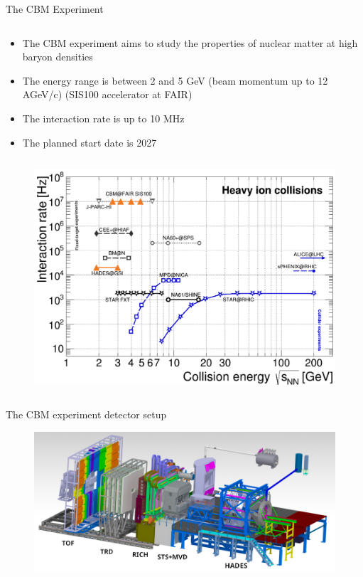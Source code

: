 \begin{columnframe}{The CBM Experiment}
    \begin{column}{0.5\textwidth}
        \begin{itemize}
            \item The CBM experiment aims to study the properties of nuclear matter at high baryon densities
            \item The energy range is between 2 and 5 GeV (beam momentum up to 12 AGeV/c)
                  (SIS100 accelerator at FAIR)
            \item The interaction rate is up to 10 MHz
            \item The planned start date is 2027
        \end{itemize}
    \end{column}
    \begin{column}{0.5\textwidth}
        \begin{figure}
            \centering
            \includegraphics[width=\textwidth, frame]{images/galatyuk_map_of_experiments.png}
        \end{figure}
    \end{column}
\end{columnframe}

\begin{frame}{The CBM experiment detector setup}
    \begin{figure}
        \centering
        \includegraphics[width=\textwidth, frame]{images/CBM_HADES_new_setup.png}
    \end{figure}
\end{frame}

